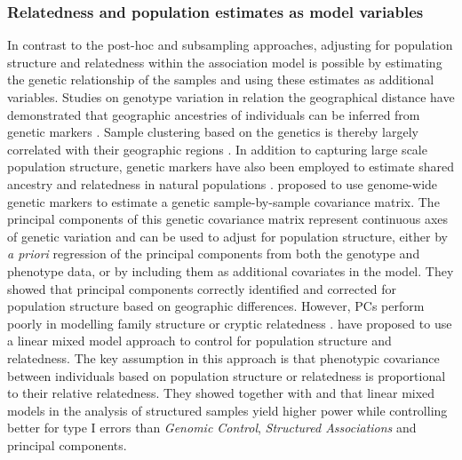 \subsubsection{Relatedness and population estimates as model variables}
\label{subsubsection:relatedness-model-variables}
In contrast to the post-hoc and subsampling approaches, adjusting for population structure and relatedness within the association model is possible by estimating the genetic relationship of the samples and using these estimates as additional variables. Studies on genotype variation in relation the geographical distance have demonstrated that geographic ancestries of individuals can be inferred from genetic markers \citep{Rosenberg2002,Tang2005}. Sample clustering based on the genetics is thereby largely correlated with their geographic regions \citep{Rosenberg2005}. In addition to capturing large scale population structure, genetic markers have also been employed to estimate shared ancestry and relatedness in natural populations \citep{Lynch1999,Ritland2000,Thomas2005}. \citet{Price2006} proposed to use genome-wide genetic markers to estimate a genetic sample-by-sample covariance matrix. The principal components of this genetic covariance matrix represent continuous axes of genetic variation and can be used to adjust for population structure, either by \textit{a priori} regression of the principal components from both the genotype and phenotype data, or by including them as additional covariates in the model. They showed that principal components correctly identified and corrected for population structure based on geographic differences. However, PCs perform poorly in modelling family structure or cryptic relatedness  \citep{Yu2006,Zhao2007,Kang2010,Casale2015}. \citet{Yu2006} have proposed to use a linear mixed model approach to control for population structure and relatedness. The key assumption in this approach is that phenotypic covariance between individuals based on population structure or relatedness is proportional to their relative relatedness. They showed together with \citet{Malosetti2007} and \citet{Zhao2007} that linear mixed models in the analysis of structured samples yield higher power while controlling better for type I errors than \textit{Genomic Control}, \textit{Structured Associations} and principal components.

